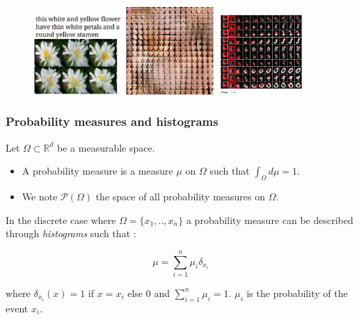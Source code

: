 \documentclass[french,9pt]{beamer}
\begin{document}
\begin{frame}
\begin{figure}
  \begin{center}
    \includegraphics[width=0.3\textwidth]{fig/text_to_image.png}\hspace{1mm}
     \includegraphics[width=0.3\textwidth]{fig/data_augm.png}\hspace{1mm}
      \includegraphics[width=0.3\textwidth]{fig/draw.png}
  \end{center}
  \caption{\cite{DBLP:journals/corr/ReedAYLSL16,2017arXiv171104340A,2015arXiv150204623G}}
\end{figure}


\end{frame}

\begin{frame}
\frametitle{Probability measures and histograms}

Let $\Omega \subset \mathbb{R}^{d}$ be a measurable space.
\begin{itemize}
\item A probability measure is a measure $\mu$ on $\Omega$ such that $\int_{\Omega} d\mu=1$.
\item We note $\mathcal{P}(\Omega)$ the space of all probability measures on $\Omega$.
\end{itemize}

In the discrete case where  $\Omega=\{x_{1},..,x_{n}\}$ a probability measure can be described through \emph{histograms} such that :

$$\mu=\sum_{i=1}^{n} \mu_{i} \delta_{x_{i}} $$

 where $\delta_{x_{i}}(x)=1$ if $x=x_{i}$ else $0$ and $\sum_{i=1}^{n} \mu_{i}=1$. $\mu_{i}$ is the probability of the event $x_{i}$. 


\end{frame}
\end{document}
